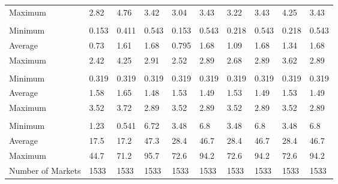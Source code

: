 \begin{tabular}[t]{llllllllll}
\hspace{1em}Maximum & 2.82 & 4.76 & 3.42 & 3.04 & 3.43 & 3.22 & 3.43 & 4.25 & 3.43\\
\addlinespace[0.3em]
\multicolumn{10}{l}{\textbf{Marginal Cost}}\\
\hspace{1em}Minimum & 0.153 & 0.411 & 0.543 & 0.153 & 0.543 & 0.218 & 0.543 & 0.218 & 0.543\\
\hspace{1em}Average & 0.73 & 1.61 & 1.68 & 0.795 & 1.68 & 1.09 & 1.68 & 1.34 & 1.68\\
\hspace{1em}Maximum & 2.42 & 4.25 & 2.91 & 2.52 & 2.89 & 2.68 & 2.89 & 3.62 & 2.89\\
\addlinespace[0.3em]
\multicolumn{10}{l}{\textbf{Miles Flown}}\\
\hspace{1em}Minimum & 0.319 & 0.319 & 0.319 & 0.319 & 0.319 & 0.319 & 0.319 & 0.319 & 0.319\\
\hspace{1em}Average & 1.58 & 1.65 & 1.48 & 1.53 & 1.49 & 1.53 & 1.49 & 1.53 & 1.49\\
\hspace{1em}Maximum & 3.52 & 3.72 & 2.89 & 3.52 & 2.89 & 3.52 & 2.89 & 3.52 & 2.89\\
\addlinespace[0.3em]
\multicolumn{10}{l}{\textbf{Origin Service Ratio}}\\
\hspace{1em}Minimum & 1.23 & 0.541 & 6.72 & 3.48 & 6.8 & 3.48 & 6.8 & 3.48 & 6.8\\
\hspace{1em}Average & 17.5 & 17.2 & 47.3 & 28.4 & 46.7 & 28.4 & 46.7 & 28.4 & 46.7\\
\hspace{1em}Maximum & 44.7 & 71.2 & 95.7 & 72.6 & 94.2 & 72.6 & 94.2 & 72.6 & 94.2\\
\midrule
Number of Markets & 1533 & 1533 & 1533 & 1533 & 1533 & 1533 & 1533 & 1533 & 1533\\
\bottomrule
\end{tabular}
